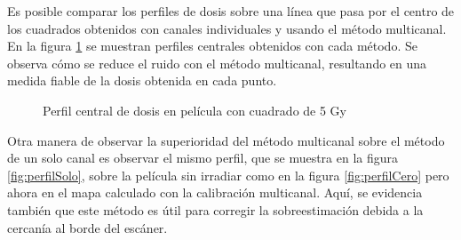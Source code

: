 Es posible comparar los perfiles de dosis sobre una línea que pasa por el centro de los cuadrados obtenidos con canales individuales y usando el método multicanal. En la figura \ref{fig:perfilesMapaCuadrado} se muestran perfiles centrales obtenidos con cada método. Se observa cómo se reduce el ruido con el método multicanal, resultando en una medida fiable de la dosis obtenida en cada punto. 
\begin{figure}[H]
	\centering
	\hfill
	\caption{Perfil central de dosis en película con cuadrado de 5 Gy}
	\label{fig:perfilesMapaCuadrado}
\end{figure}

Otra manera de observar la superioridad del método multicanal sobre el método de un solo canal es observar el mismo perfil, que se muestra en la figura \ref{fig:perfilSolo}, sobre la película sin irradiar como en la figura \ref{fig:perfilCero} pero ahora en el mapa calculado con la calibración multicanal. Aquí, se evidencia también que este método es útil para corregir la sobreestimación debida a la cercanía al borde del escáner.\\

